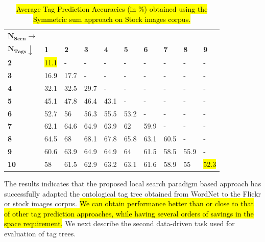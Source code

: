 \begin{table}[!htp]
\fontsize{8pt}{1em}\selectfont
\begin{center}
\caption{\hl{Average Tag Prediction Accuracies (in \%) obtained using the Symmetric sum approach on Stock images corpus.}}
\label{tab:TPGWS30Jij}
\begin{tabular}{|p{1.5cm}|p{0.5cm}|p{0.5cm}|p{0.5cm}|p{0.5cm}|p{0.5cm}|p{0.5cm}|p{0.5cm}|p{0.5cm}|p{0.5cm}|}
		\hline
		{$\boldsymbol{N_{Seen} \rightarrow}$} & &  &  &  & &  &  &  &\\ 
		{$\boldsymbol{N_{Tags}}\downarrow $} & \textbf{1} & \textbf{2} & \textbf{3} & \textbf{4} & \textbf{5}  & \textbf{6} & \textbf{7} & \textbf{8} & \textbf{9} \\ 
		\hline 		
		\textbf{2} & \hl{11.1} & -  & -  & -  & -  & -  & -  & -  & - \\
		\hline
		\textbf{3} & 16.9 & 17.7 & -  & -  & -  & -  & -  & -  & -\\ 
		\hline
		\textbf{4} & 32.1 & 32.5 & 29.7 & -  & -  & -  & -  & -  & - \\
		\hline
		\textbf{5} & 45.1 & 47.8 & 46.4 & 43.1 & -  & -  & -  & -  & - \\
		\hline
		\textbf{6} & 52.7 & 56 & 56.3 & 55.5 & 53.2 & -  & -  & -  & - \\
		\hline
		\textbf{7} & 62.1 & 64.6 & 64.9 & 63.9 & 62 & 59.9 & -  & -  & - \\
		\hline
		\textbf{8} & 64.5 & 68 & 68.1 & 67.8 & 65.8 & 63.1 & 60.5 & -  & - \\
		\hline
		\textbf{9} & 60.6 & 63.9 & 64.9 & 64.9 & 64 & 61.5 & 58.5 & 55.9 & - \\
		\hline
		\textbf{10} & 58 & 61.5 & 62.9 & 63.2 & 63.1 & 61.6 & 58.9 & 55 & \hl{52.3}\\
		\hline
\end{tabular}
\vspace{-2.5mm}
\end{center}
\end{table}


\indent The results indicates that the proposed local search paradigm based approach has successfully adapted the ontological tag tree obtained from WordNet to the Flickr or stock images corpus. \hl{We can obtain performance better than or close to that of other tag prediction approaches, while having several orders of savings in the space requirement. } We next describe the second data-driven task used for evaluation of tag trees. 
